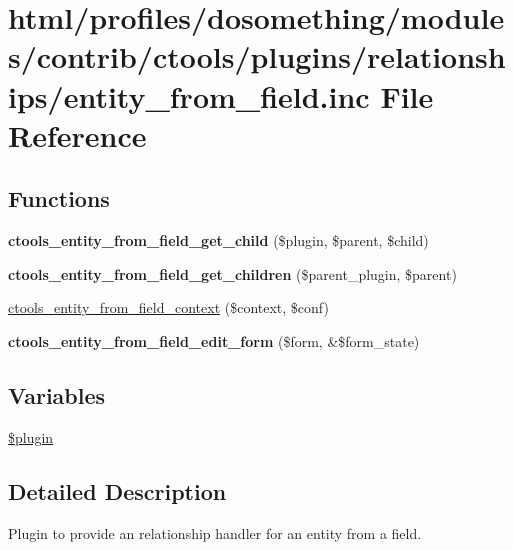 \hypertarget{entity__from__field_8inc}{
\section{html/profiles/dosomething/modules/contrib/ctools/plugins/relationships/entity\_\-from\_\-field.inc File Reference}
\label{entity__from__field_8inc}
}
\subsection*{Functions}
\begin{DoxyCompactItemize}
\item 
\hypertarget{entity__from__field_8inc_a239d9d9eeb75786c99ef69ba2a5dc158}{
{\bfseries ctools\_\-entity\_\-from\_\-field\_\-get\_\-child} (\$plugin, \$parent, \$child)}
\label{entity__from__field_8inc_a239d9d9eeb75786c99ef69ba2a5dc158}

\item 
\hypertarget{entity__from__field_8inc_afc610270d8f27b9f7e55380e2dcd3952}{
{\bfseries ctools\_\-entity\_\-from\_\-field\_\-get\_\-children} (\$parent\_\-plugin, \$parent)}
\label{entity__from__field_8inc_afc610270d8f27b9f7e55380e2dcd3952}

\item 
\hyperlink{entity__from__field_8inc_a90eee9e4a648484dfc3de0d3f79cdfa8}{ctools\_\-entity\_\-from\_\-field\_\-context} (\$context, \$conf)
\item 
\hypertarget{entity__from__field_8inc_a6c80421f765296ff2c821d022fc33a83}{
{\bfseries ctools\_\-entity\_\-from\_\-field\_\-edit\_\-form} (\$form, \&\$form\_\-state)}
\label{entity__from__field_8inc_a6c80421f765296ff2c821d022fc33a83}

\end{DoxyCompactItemize}
\subsection*{Variables}
\begin{DoxyCompactItemize}
\item 
\hyperlink{entity__from__field_8inc_ada8a7130088351710bb02ed622d6bf65}{\$plugin}
\end{DoxyCompactItemize}


\subsection{Detailed Description}
Plugin to provide an relationship handler for an entity from a field. 

